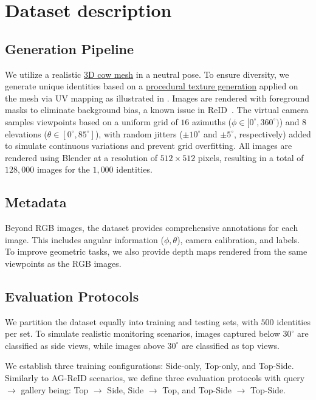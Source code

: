 \section{Dataset description}
\label{sec:dataset_description}
\subsection{Generation Pipeline}
\label{subsec:generation-pipeline}

We utilize a realistic \href{https://www.turbosquid.com/3d-models/cow-3d-model/1126261}{3D cow mesh} in a neutral pose.
To ensure diversity, we generate unique identities based on a \href{https://github.com/CorentinDumery/cow-tex-generator}{procedural texture generation} applied on the mesh via UV mapping as illustrated in .
Images are rendered with foreground masks to eliminate background bias, a known issue in ReID~\cite{picekAnimalIdentificationIndependent2024a,tianEliminatingBackgroundbiasRobust2018, yuAddressingElephantRoom2024}.
The virtual camera samples viewpoints based on a uniform grid of $16$ azimuths ($\phi \in [0^\circ, 360^\circ)$) and $8$ elevations ($\theta \in [0^\circ, 85^\circ]$), with random jitters ($\pm{10}^\circ$ and $\pm{5}^\circ$, respectively) added to simulate continuous variations and prevent grid overfitting.
All images are rendered using Blender at a resolution of $512 \times 512$ pixels, resulting in a total of $128,000$ images for the $1,000$ identities.

\subsection{Metadata}
\label{subsec:metadata}

Beyond RGB images, the dataset provides comprehensive annotations for each image.
This includes angular information ($\phi, \theta$), camera calibration, and labels.
To improve geometric tasks, we also provide depth maps rendered from the same viewpoints as the RGB images.

\subsection{Evaluation Protocols}
\label{subsec:eval_prot}

We partition the dataset equally into training and testing sets, with $500$ identities per set.
To simulate realistic monitoring scenarios, images captured below $30^\circ$ are classified as side views, while images above $30^\circ$ are classified as top views.

We establish three training configurations: Side-only, Top-only, and Top-Side.
Similarly to AG-ReID scenarios, we define three evaluation protocols with query $\rightarrow$ gallery being: Top $\rightarrow$ Side, Side $\rightarrow$ Top, and Top-Side $\rightarrow$ Top-Side.

